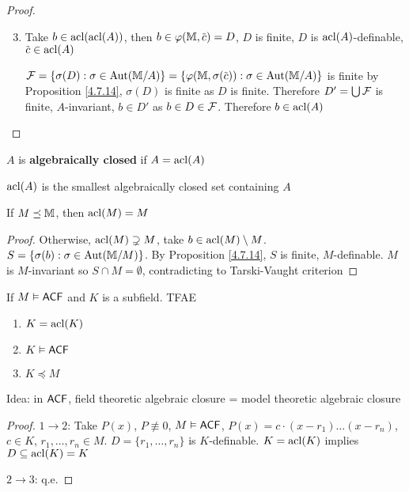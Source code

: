 \documentclass[11pt]{article}
\begin{document}
\begin{proof}
\begin{enumerate}
\setcounter{enumi}{2}
\item Take \(b\in\operatorname{acl}(\operatorname{acl}(A))\), then \(b\in\varphi(\M,\barc)=D\), \(D\) is finite, \(D\)
is \(\operatorname{acl}(A)\)-definable, \(\barc\in\acl(A)\)

\(\calf=\{\sigma(D):\sigma\in\Aut(\M/A)\}=\{\varphi(\M,\sigma(\barc)):\sigma\in\Aut(\M/A)\}\) is finite by Proposition
\ref{4.7.14}, \(\sigma(D)\) is finite as \(D\) is finite. Therefore \(D'=\bigcup\mathcal{F}\) is
finite, \(A\)-invariant, \(b\in D'\) as \(b\in D\in\mathcal{F}\). Therefore \(b\in\operatorname{acl}(A)\)
\end{enumerate}
\end{proof}

\begin{definition}[]
\label{4.7.16}
\(A\) is \textbf{algebraically closed} if \(A=\operatorname{acl}(A)\)
\end{definition}

\begin{proposition}[]
\(\operatorname{acl}(A)\) is the smallest algebraically closed set containing \(A\)
\end{proposition}

\begin{proposition}[]
\label{4.7.18}
If \(M\preceq\mathbb{M}\), then \(\operatorname{acl}(M)=M\)
\end{proposition}

\begin{proof}
Otherwise, \(\operatorname{acl}(M)\supsetneq M\), take \(b\in\operatorname{acl}(M)\setminus M\). \(S=\{\sigma(b):\sigma\in\operatorname{\text{Aut}}(\mathbb{M}/M)\}\). By
Proposition \ref{4.7.14}, \(S\) is finite, \(M\)-definable. \(M\) is \(M\)-invariant
so \(S\cap M=\emptyset\), contradicting to Tarski-Vaught criterion
\end{proof}

\begin{proposition}[]
If \(M\vDash\textsf{ACF}\) and \(K\) is a subfield. TFAE
\begin{enumerate}
\item \(K=\operatorname{acl}(K)\)
\item \(K\vDash\textsf{ACF}\)
\item \(K\preceq M\)
\end{enumerate}
\end{proposition}

Idea: in \(\textsf{ACF}\), field theoretic algebraic closure = model theoretic algebraic closure

\begin{proof}
\(1\to 2\):
Take \(P(x)\),
\(P\not\equiv 0\), \(M\vDash\textsf{ACF}\), \(P(x)=c\cdot(x-r_1)\dots(x-r_n)\), \(c\in K\), \(r_1,\dots,r_n\in M\). \(D=\{r_1,\dots,r_n\}\)
is \(K\)-definable. \(K=\operatorname{acl}(K)\) implies \(D\subseteq\operatorname{acl}(K)=K\)

\(2\to 3\): q.e.
\end{proof}
\end{document}
